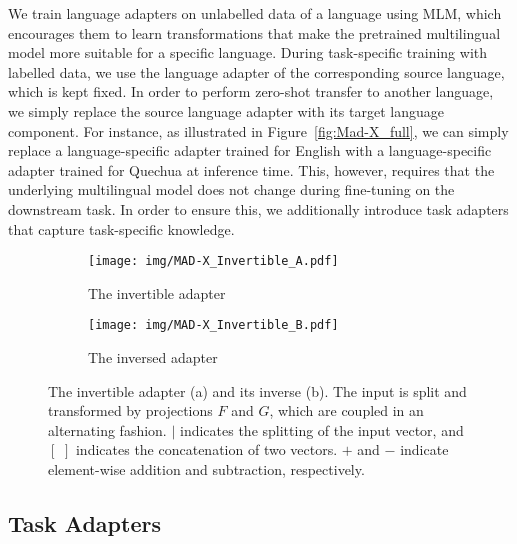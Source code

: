 \documentclass[11pt,a4paper]{article}
\begin{document}
We train language adapters on unlabelled data of a language using MLM, which encourages them to learn transformations that make the pretrained multilingual model more suitable for a specific language. During task-specific training with labelled data, we use the language adapter of the corresponding source language, which is kept fixed. In order to perform zero-shot transfer to another language, we simply replace the source language adapter with its target language component. For instance, as illustrated in Figure~\ref{fig:Mad-X_full}, we can simply replace a language-specific adapter trained for English with a language-specific adapter trained for Quechua at inference time. This, however, requires that the underlying multilingual model does not change during fine-tuning on the downstream task. In order to ensure this, we additionally introduce task adapters that capture task-specific knowledge.

\begin{figure}[!t]
    \centering
    \begin{subfigure}[t]{0.466\linewidth}
        \centering
        \texttt{[image: img/MAD-X\_Invertible\_A.pdf]}
        \caption{The invertible adapter}
        \label{fig:invertible-adapter}
    \end{subfigure}
    \hspace{2mm}
    \begin{subfigure}[t]{0.475\linewidth}
        \centering
        \texttt{[image: img/MAD-X\_Invertible\_B.pdf]}
\caption{The inversed adapter}
        \label{fig:inverse-invertible-adapter}
    \end{subfigure}
    \vspace{-1.5mm}
    \caption{The invertible adapter (a) and its inverse (b). The input is split and transformed by projections $F$ and $G$, which are coupled in an alternating fashion. $|$ indicates the splitting of the input vector, and $[\,\,]$ indicates the concatenation of two vectors. $+$ and $-$ indicate element-wise addition and subtraction, respectively.  }
    \vspace{-1.5mm}
\label{fig:invertible-adapter-variants}
\end{figure}

\subsection{Task Adapters}
\end{document}
